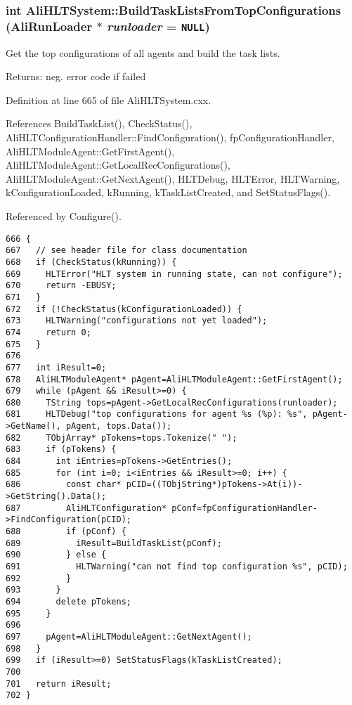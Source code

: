 \subsubsection{\setlength{\rightskip}{0pt plus 5cm}int Ali\-HLTSystem::Build\-Task\-Lists\-From\-Top\-Configurations (Ali\-Run\-Loader $\ast$ {\em runloader} = {\tt NULL})}\label{classAliHLTSystem_a27}


Get the top configurations of all agents and build the task lists. \begin{Desc}
\item[Returns:]neg. error code if failed \end{Desc}


Definition at line 665 of file Ali\-HLTSystem.cxx.

References Build\-Task\-List(), Check\-Status(), Ali\-HLTConfiguration\-Handler::Find\-Configuration(), fp\-Configuration\-Handler, Ali\-HLTModule\-Agent::Get\-First\-Agent(), Ali\-HLTModule\-Agent::Get\-Local\-Rec\-Configurations(), Ali\-HLTModule\-Agent::Get\-Next\-Agent(), HLTDebug, HLTError, HLTWarning, k\-Configuration\-Loaded, k\-Running, k\-Task\-List\-Created, and Set\-Status\-Flags().

Referenced by Configure().

\footnotesize\begin{verbatim}666 {
667   // see header file for class documentation
668   if (CheckStatus(kRunning)) {
669     HLTError("HLT system in running state, can not configure");
670     return -EBUSY;
671   }
672   if (!CheckStatus(kConfigurationLoaded)) {
673     HLTWarning("configurations not yet loaded");
674     return 0;
675   }
676 
677   int iResult=0;
678   AliHLTModuleAgent* pAgent=AliHLTModuleAgent::GetFirstAgent();
679   while (pAgent && iResult>=0) {
680     TString tops=pAgent->GetLocalRecConfigurations(runloader);
681     HLTDebug("top configurations for agent %s (%p): %s", pAgent->GetName(), pAgent, tops.Data());
682     TObjArray* pTokens=tops.Tokenize(" ");
683     if (pTokens) {
684       int iEntries=pTokens->GetEntries();
685       for (int i=0; i<iEntries && iResult>=0; i++) {
686         const char* pCID=((TObjString*)pTokens->At(i))->GetString().Data();
687         AliHLTConfiguration* pConf=fpConfigurationHandler->FindConfiguration(pCID);
688         if (pConf) {
689           iResult=BuildTaskList(pConf);
690         } else {
691           HLTWarning("can not find top configuration %s", pCID);
692         }
693       }
694       delete pTokens;
695     }
696     
697     pAgent=AliHLTModuleAgent::GetNextAgent();
698   }
699   if (iResult>=0) SetStatusFlags(kTaskListCreated);
700 
701   return iResult;
702 }
\end{verbatim}\normalsize 


